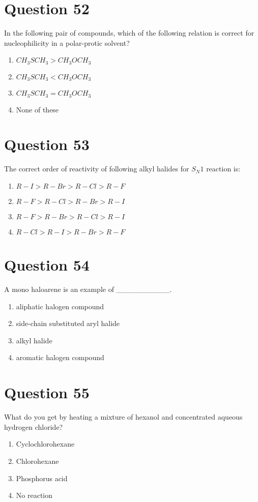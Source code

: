 \documentclass{article}
\begin{document}
\section*{Question 52}
In the following pair of compounds, which of the following relation is correct for nucleophilicity in a polar-protic solvent?
\begin{enumerate}[label=(\alph*)]
\item \(CH _3 SCH _3> CH _3 OCH _3\)
\item \(CH _3 SCH _3< CH _3 OCH _3\)
\item \(CH _3 SCH _3= CH _3 OCH _3\)
\item None of these
\end{enumerate}
\newpage
\section*{Question 53}
The correct order of reactivity of following alkyl halides for \(S_N 1\) reaction is:
\begin{enumerate}[label=(\alph*)]
\item \(R - I > R - Br > R - Cl > R - F\)
\item \(R - F > R - Cl > R - Br > R - I\)
\item \(R - F > R - Br > R - Cl > R - I\)
\item \(R - Cl > R - I > R - Br > R - F\)
\end{enumerate}
\newpage
\section*{Question 54}
A mono haloarene is an example of __________.
\begin{enumerate}[label=(\alph*)]
\item aliphatic halogen compound
\item side-chain substituted aryl halide
\item alkyl halide
\item aromatic halogen compound
\end{enumerate}
\newpage
\section*{Question 55}
What do you get by heating a mixture of hexanol and concentrated aqueous hydrogen chloride?
\begin{enumerate}[label=(\alph*)]
\item Cyclochlorohexane
\item Chlorohexane
\item Phosphorus acid
\item No reaction
\end{enumerate}
\newpage
\end{document}
